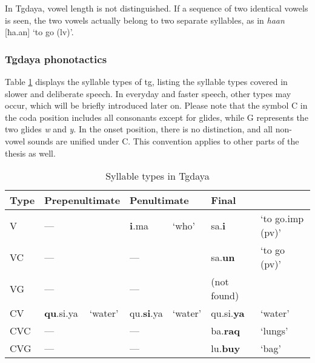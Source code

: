 In Tgdaya, vowel length is not distinguished. If a sequence of two identical vowels is seen, the two vowels actually belong to two separate syllables, as in \textit{haan} [ħa.an] `to go (\acs{lv})'.

\subsubsection{Tgdaya phonotactics} \label{sec:tg_phonotactics}

Table \ref{tab:sy_ty_tg} displays the syllable types of \acl{tg}, listing the syllable types covered in slower and deliberate speech. In everyday and faster speech, other types may occur, which will be briefly introduced later on. Please note that the symbol C in the coda position includes all consonants except for glides, while G represents the two glides \textit{w} and \textit{y}. In the onset position, there is no distinction, and all non-vowel sounds are unified under C. This convention applies to other parts of the thesis as well.

\begin{table}[!htbp]
\centering
\caption{Syllable types in Tgdaya}
\label{tab:sy_ty_tg}
\begin{tabular}{lllllll}
\hline
Type & \multicolumn{2}{l}{Prepenultimate} & \multicolumn{2}{l}{Penultimate} & \multicolumn{2}{l}{Final}                \\ \hline
V             & ---              &                 & \textbf{i}.ma            & `who'         & sa.\textbf{i}        & `to go.\acs{imp} (\acs{pv})' \\
VC            & ---              &                 & ---             &               & sa.\textbf{un}       & `to go (\acs{pv})'           \\
VG            & ---              &                 & ---             &               & (not found) &                            \\
CV            & \textbf{qu}.si.ya         & `water'         & qu.\textbf{si}.ya        & `water'       & qu.si.\textbf{ya}    & `water'                    \\
CVC           & ---              &                 & ---             &               & ba.\textbf{raq}      & `lungs'                    \\
CVG           & ---              &                 & ---             &               & lu.\textbf{buy}      & `bag'                     \\ \hline
\end{tabular}
\end{table}


